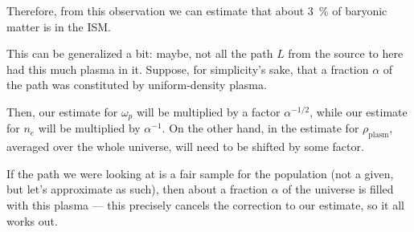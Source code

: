 \documentclass[main.tex]{subfiles}
\begin{document}
Therefore, from this observation we can estimate that about \SI{3}{\percent} of baryonic matter is in the ISM. 

This can be generalized a bit: maybe, not all the path \(L\) from the source to here had this much plasma in it. 
Suppose, for simplicity's sake, that a fraction \(\alpha \) of the path was constituted by uniform-density plasma. 

Then, our estimate for \(\omega _p\) will be multiplied by a factor \(\alpha^{-1/2}\), while our estimate for \(n_e\) will be multiplied by \(\alpha^{-1}\). 
On the other hand, in the estimate for \(\rho _{\text{plasm}}\), averaged over the whole universe, will need to be shifted by some factor. 

If the path we were looking at is a fair sample for the population (not a given, but let's approximate as such), then about a fraction \(\alpha \) of the universe is filled with this plasma --- this precisely cancels the correction to our estimate, so it all works out. 
\end{document}
